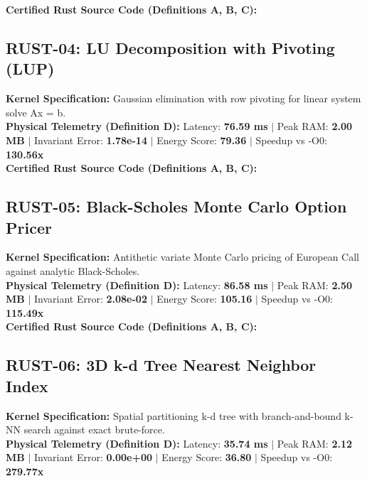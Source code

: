 \textbf{Certified Rust Source Code (Definitions A, B, C):}


\vspace{1em}
\subsection{RUST-04: LU Decomposition with Pivoting (LUP)}
\textbf{Kernel Specification:} Gaussian elimination with row pivoting for linear system solve Ax = b.\\
\textbf{Physical Telemetry (Definition D):} Latency: \textbf{76.59 ms} $|$ Peak RAM: \textbf{2.00 MB} $|$ Invariant Error: \textbf{1.78e-14} $|$ Energy Score: \textbf{79.36} $|$ Speedup vs -O0: \textbf{130.56x}\\

\textbf{Certified Rust Source Code (Definitions A, B, C):}


\vspace{1em}
\subsection{RUST-05: Black-Scholes Monte Carlo Option Pricer}
\textbf{Kernel Specification:} Antithetic variate Monte Carlo pricing of European Call against analytic Black-Scholes.\\
\textbf{Physical Telemetry (Definition D):} Latency: \textbf{86.58 ms} $|$ Peak RAM: \textbf{2.50 MB} $|$ Invariant Error: \textbf{2.08e-02} $|$ Energy Score: \textbf{105.16} $|$ Speedup vs -O0: \textbf{115.49x}\\

\textbf{Certified Rust Source Code (Definitions A, B, C):}


\vspace{1em}
\subsection{RUST-06: 3D k-d Tree Nearest Neighbor Index}
\textbf{Kernel Specification:} Spatial partitioning k-d tree with branch-and-bound k-NN search against exact brute-force.\\
\textbf{Physical Telemetry (Definition D):} Latency: \textbf{35.74 ms} $|$ Peak RAM: \textbf{2.12 MB} $|$ Invariant Error: \textbf{0.00e+00} $|$ Energy Score: \textbf{36.80} $|$ Speedup vs -O0: \textbf{279.77x}\\

